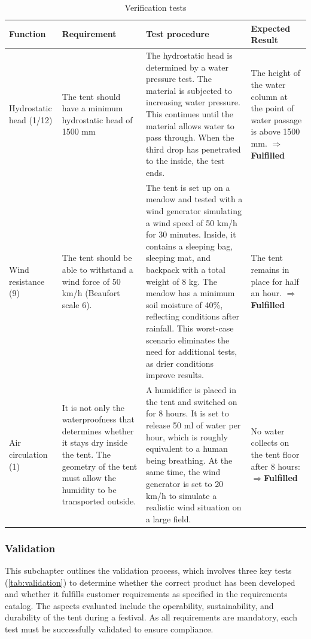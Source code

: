 \documentclass{article}
\begin{document}
\begin{table}[ht!]
    \caption{Verification tests}
    \label{tab:verification}
    \begin{tabularx}{\textwidth}{|>{\raggedright\arraybackslash}p{2.5cm}|>{\raggedright\arraybackslash}p{3.5cm}|>{\raggedright\arraybackslash}p{6cm}|>{\raggedright\arraybackslash}X|}
    \hline
    \rowcolor[gray]{0.75}
    \textbf{Function} & \textbf{Requirement} & \textbf{Test procedure} & \textbf{Expected Result} \\
    \hline
    Hydrostatic head (1/12) & 
    The tent should have a minimum hydrostatic head of 1500 mm & 
    The hydrostatic head is determined by a water pressure test. The material is subjected to increasing water pressure. This continues until the material allows water to pass through. When the third drop has penetrated to the inside, the test ends. &
    The height of the water column at the point of water passage is above 1500 mm. $\mathbf{\Rightarrow}$\textcolor{newgreen}{\textbf{Fulfilled}} \\
    \hline
    Wind resistance (9) &
    The tent should be able to withstand a wind force of 50 km/h (Beaufort scale 6). &
    The tent is set up on a meadow and tested with a wind generator simulating a wind speed of 50 km/h for 30 minutes. Inside, it contains a sleeping bag, sleeping mat, and backpack with a total weight of 8 kg. The meadow has a minimum soil moisture of 40\%, reflecting conditions after rainfall. This worst-case scenario eliminates the need for additional tests, as drier conditions improve results. &
    The tent remains in place for half an hour. $\mathbf{\Rightarrow}$\textcolor{newgreen}{\textbf{Fulfilled}} \\
    \hline
    Air circulation (1) &
    It is not only the waterproofness that determines whether it stays dry inside the tent. The geometry of the tent must allow the humidity to be transported outside. &
    A humidifier is placed in the tent and switched on for 8 hours. It is set to release 50 ml of water per hour, which is roughly equivalent to a human being breathing. At the same time, the wind generator is set to 20 km/h to simulate a realistic wind situation on a large field. &
    No water collects on the tent floor after 8 hours: $\mathbf{\Rightarrow}$\textcolor{newgreen}{\textbf{Fulfilled}} \\
    \hline
    \end{tabularx}
\end{table}

\newpage
\subsubsection{Validation}
This subchapter outlines the validation process, which involves three key tests
(\autoref{tab:validation}) to determine whether the correct product has been developed
and whether it fulfills customer requirements as specified in the requirements catalog. The
aspects evaluated include the operability, sustainability, and durability of the tent during a
festival. As all requirements are mandatory, each test must be successfully validated to ensure
compliance.
\end{document}
